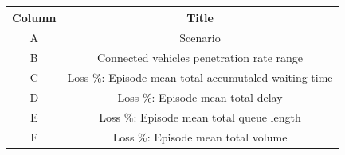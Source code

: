 \begin{table}[htbp]
\centering
\setlength\tabcolsep{2pt}
\begin{tabular}{|c|c|}
\hline
Column &                                               Title \\
\hline
     A &                                            Scenario \\
     B &            Connected vehicles penetration rate range \\
     C & Loss \%: Episode mean total accumutaled waiting time \\
     D &                    Loss \%: Episode mean total delay \\
     E &             Loss \%: Episode mean total queue length \\
     F &                   Loss \%: Episode mean total volume \\
\hline
\end{tabular}
\end{table}

